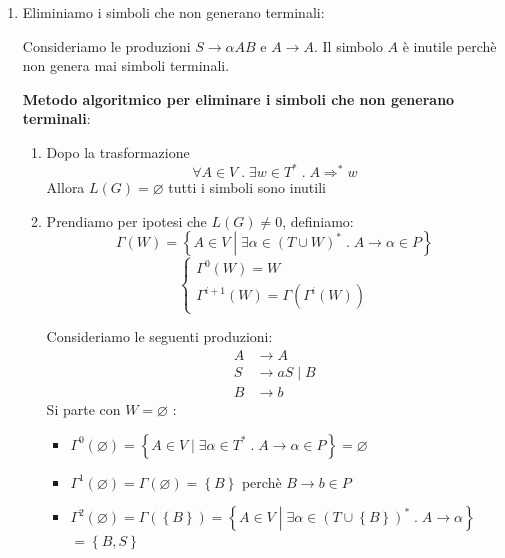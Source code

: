 \documentclass[a4paper]{article}
\begin{document}
\begin{enumerate}
  \item \label{eliminazione_simboli_inutili_1}
    Eliminiamo i simboli che non generano terminali:
    \begin{example}
      Consideriamo le produzioni \( S \to \alpha A B \) e \( A \to A \).
      Il simbolo \( A \) è inutile perchè non genera mai simboli terminali.
    \end{example}

    \textbf{Metodo algoritmico per eliminare i simboli che non generano terminali}:
    \begin{enumerate}
      \item Dopo la trasformazione 
        \[
          \forall A \in V \;.\; \exists w \in T^* \;.\;
          A \Rightarrow^* w
        \] 
        Allora \( L(G) = \varnothing \) tutti i simboli sono inutili

      \item Prendiamo per ipotesi che \( L(G) \neq 0 \), definiamo:
        \[
          \Gamma(W) = \left\{ A \in V \;\left|\; \exists \alpha \in (T \cup W)^* \;.\;
        A \to \alpha \in P \right. \right\}
        \] 
        \[
          \begin{cases}
            \Gamma^0(W) = W\\
            \Gamma^{i+1}(W) = \Gamma \left( \Gamma^i(W) \right) 
          \end{cases}
        \] 
        \begin{example}
          Consideriamo le seguenti produzioni:
          \[
          \begin{aligned}
            A &\to A\\
            S &\to aS \;|\; B\\
            B &\to b
          \end{aligned}
          \] 
          Si parte con \( W = \varnothing \) :
          \begin{itemize}
            \item \( \Gamma^0(\varnothing) = \left\{ A \in V \;|\; \exists
              \alpha \in T^* \;.\; A \to \alpha \in P \right\} = \varnothing \)

            \item \( \Gamma^1(\varnothing) = \Gamma(\varnothing) =
              \left\{ B \right\} \) perchè \( B \to b \in P \)

            \item \( \Gamma^2(\varnothing) = \Gamma(\left\{ B \right\}) =
              \left\{ A \in V \;\left|\; \exists \alpha \in (T \cup \left\{ B \right\})^* \;.\;
            A \to \alpha \right. \right\}\)\\ \( = \left\{ B, S \right\} \)


\end{itemize}
\end{example}
\end{enumerate}
\end{enumerate}
\end{document}

